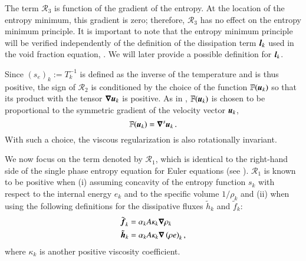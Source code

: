 \documentclass[preprint,10pt]{elsarticle}
\begin{document}
The term ${\mathcal{R}_3}$ is  function of the gradient of the entropy.  
At the location of the entropy minimum, this gradient is zero; therefore, $\mathcal{R}_3$ 
has no effect on the entropy minimum principle. It is important to note that the entropy minimum principle will be verified
independently of the definition of the dissipation term $\boldsymbol l_k$ used in the void fraction
equation, . We will later provide a possible definition for $\boldsymbol l_k$.

Since $(s_e)_k:=T_k^{-1}$ is defined as the inverse of the temperature and is thus positive, the sign of $\mathcal{R}_2$ is conditioned by the choice of the function $\mathbb{F}(\boldsymbol u_k)$ so that its product with the tensor $\boldsymbol\nabla \boldsymbol u_k$ is positive. As in \cite{jlg, Marco_paper_low_mach}, $\mathbb{F}(\boldsymbol u_k)$ is chosen to be proportional to the symmetric gradient of the velocity vector $\boldsymbol u_k$, %
\begin{equation}
\mathbb{F}(\boldsymbol u_k) = \boldsymbol\nabla^s \boldsymbol u_k \,.
\end{equation}
With such a choice, the viscous regularization is also rotationally invariant.
%

We now focus on the term denoted by $\mathcal{R}_1$, which is identical to the right-hand side of the single phase entropy equation for Euler equations (see \cite{jlg, Marco_paper_low_mach}). $\mathcal{R}_1$ is known to be positive when (i) assuming concavity of the entropy function $s_k$ with respect to the internal energy $e_k$ and to the specific volume $1 / \rho_k$ and (ii) when using the following definitions for the dissipative fluxes $\tilde{h}_k$ and $\tilde{f}_k$:
%
\begin{subequations} \label{eq:def_visc}
\begin{align}
&\tilde{\boldsymbol f}_k = \alpha_k A \kappa_k \boldsymbol\nabla \rho_k \\
&\tilde{\boldsymbol h}_k = \alpha_k A \kappa_k \boldsymbol\nabla \left( \rho e \right)_k,
\end{align}
\end{subequations}
%  
where $\kappa_k$ is another positive viscosity coefficient. 
\end{document}
